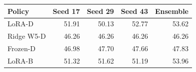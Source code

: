 {\small\setlength{\tabcolsep}{4pt}
\begin{tabularx}{\textwidth}{Xrrrr}
\toprule
Policy & Seed 17 & Seed 29 & Seed 43 & Ensemble \\
\midrule
LoRA-D & 51.91 & 50.13 & 52.77 & 53.62 \\
Ridge W5-D & 46.26 & 46.26 & 46.26 & 46.26 \\
Frozen-D & 46.98 & 47.70 & 47.66 & 47.83 \\
LoRA-B & 51.32 & 51.62 & 51.19 & 53.96 \\
\bottomrule
\end{tabularx}}
